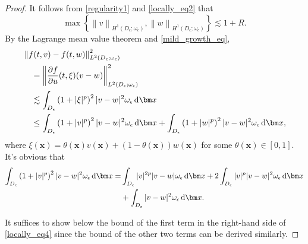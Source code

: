 \documentclass[3p,times]{elsarticle}
\numberwithin{equation}{section}
\newcommand{\dd}{\,{\rm d}}
\begin{document}
\begin{proof}
	It follows from \eqref{regularity1} and \eqref{locally_eq2} that
	\begin{equation}
		\label{locally_eq3}
		\max\left\{\left\|v\right\|_{H^1(D_{\epsilon};\omega_{\epsilon})},\left\|w\right\|_{H^1(D_{\epsilon};\omega_{\epsilon})} \right\}\lesssim 1+R.
	\end{equation}
	By the Lagrange mean value theorem and \eqref{mild_growth_eq},
	\begin{equation*}
		\begin{aligned}
			&\left\|f(t,v)-f(t,w)\right\|_{L^2(D_{\epsilon};\omega_{\epsilon})}^2\\
			&\quad=\left\|\frac{\partial f}{\partial u}(t,\xi)(v-w)\right\|_{L^2(D_{\epsilon};\omega_{\epsilon})}^2\\
			&\quad\lesssim \int_{D_{\epsilon}} \left(1+|\xi|^p\right)^2|v-w|^2\omega_{\epsilon}\dd \bm x\\
			&\quad\leq \int_{D_{\epsilon}} \left(1+|v|^p\right)^2|v-w|^2\omega_{\epsilon}\dd\bm x+\int_{D_{\epsilon}}\left(1+|w|^p\right)^2|v-w|^2\omega_{\epsilon}\dd\bm x,
		\end{aligned}
	\end{equation*}
	where $\xi(\bm x)=\theta(\bm x)v(\bm x)+(1-\theta(\bm x))w(\bm x)$ for some $\theta(\bm x)\in [0,1]$. It's obvious that
	\begin{equation}
		\begin{aligned}
			\label{locally_eq4}
			\int_{D_{\epsilon}} \left(1+|v|^p\right)^2|v-w|^2\omega_{\epsilon}\dd\bm x=&\int_{D_{\epsilon}}|v|^{2p}|v-w|\omega_{\epsilon}\dd\bm x+2\int_{D_{\epsilon}}|v|^p|v-w|^2\omega_{\epsilon}\dd\bm x\\
			&+\int_{D_{\epsilon}}|v-w|^2\omega_{\epsilon}\dd\bm x.
		\end{aligned}
	\end{equation}
	
	It suffices to show below the bound of the first term in the right-hand side of \eqref{locally_eq4} since the bound of the other two terms can be derived similarly.
	

\end{proof}
\end{document}
